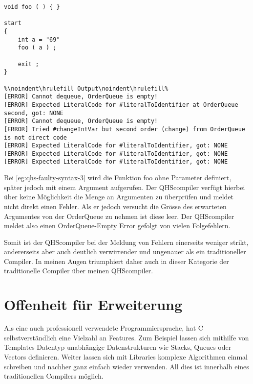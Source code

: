 \begin{lstlisting}[language=QHS, caption=QHS mit falscher Anzahl Argumente, label=eg:qhs-faulty-syntax-3]
void foo ( ) { }

start
{
    int a = "69" 
    foo ( a ) ;

    exit ;
}

%\noindent\hrulefill Output\noindent\hrulefill%
[ERROR] Cannot dequeue, OrderQueue is empty!
[ERROR] Expected LiteralCode for #literalToIdentifier at OrderQueue second, got: NONE
[ERROR] Cannot dequeue, OrderQueue is empty!
[ERROR] Tried #changeIntVar but second order (change) from OrderQueue is not direct code
[ERROR] Expected LiteralCode for #literalToIdentifier, got: NONE
[ERROR] Expected LiteralCode for #literalToIdentifier, got: NONE
[ERROR] Expected LiteralCode for #literalToIdentifier, got: NONE
\end{lstlisting}

Bei \ref{eg:qhs-faulty-syntax-3} wird die Funktion foo ohne Parameter definiert, später jedoch mit einem Argument aufgerufen. Der QHScompiler verfügt hierbei über keine Möglichkeit die Menge an Argumenten zu überprüfen
und meldet nicht direkt einen Fehler. Als er jedoch versucht die Grösse des erwarteten Argumentes von der OrderQueue zu nehmen ist diese leer.
Der QHScompiler meldet also einen OrderQueue-Empty Error gefolgt von vielen Folgefehlern.


Somit ist der QHScompiler bei der Meldung von Fehlern einerseits weniger strikt, andererseits aber auch deutlich verwirrender und ungenauer als ein traditioneller Compiler.
In meinen Augen triumphiert daher auch in dieser Kategorie der traditionelle Compiler über meinen QHScompiler.

\section{Offenheit für Erweiterung}
Als eine auch professionell verwendete Programmiersprache, hat C selbstverständlich eine Vielzahl an Features. Zum Beispiel lassen sich mithilfe von Templates Datentyp unabhängige Datenstrukturen wie Stacks, Queues oder Vectors definieren.
Weiter lassen sich mit Libraries komplexe Algorithmen einmal schreiben und nachher ganz einfach wieder verwenden. All dies ist innerhalb eines traditionellen Compilers möglich.

